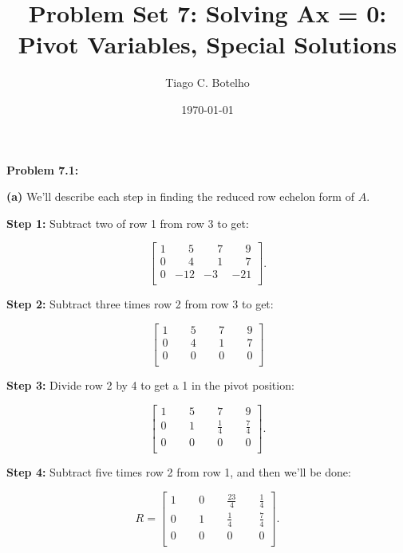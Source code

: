 \documentclass{article}
\title{Problem Set 7:  Solving Ax = 0: Pivot Variables,  Special Solutions}
\author{Tiago C. Botelho}
\date{\today}
\begin{document}
\maketitle

\noindent \textbf{Problem 7.1:}

\noindent \textbf{(a)} We'll describe each step in finding the reduced row echelon form of $A$.

\noindent \textbf{Step 1:} Subtract two of row 1 from row 3 to get:

\[
\begin{bmatrix}
1 & \phantom{-}5 & \phantom{-}7 & \phantom{-}9\\
0 & \phantom{-}4 & \phantom{-}1 & \phantom{-}7\\
0 & -12 & -3 & -21\\
\end{bmatrix}.
\]

\noindent \textbf{Step 2:} Subtract three times row 2 from row 3 to get:

\[
\begin{bmatrix}
1 & \phantom{-}5 & \phantom{-}7 & \phantom{-}9\\
0 & \phantom{-}4 & \phantom{-}1 & \phantom{-}7\\
0 & \phantom{-}0 & \phantom{-}0 & \phantom{-}0\\
\end{bmatrix}
\]

\noindent \textbf{Step 3:} Divide row 2 by 4 to get a 1 in the pivot position:

\[
\begin{bmatrix}
1 & \phantom{-}5 & \phantom{-}7 & \phantom{-}9\\
0 & \phantom{-}1 & \phantom{-}\frac{1}{4} & \phantom{-}\frac{7}{4}\\
0 & \phantom{-}0 & \phantom{-}0 & \phantom{-}0\\
\end{bmatrix}.
\]

\noindent \textbf{Step 4:} Subtract five times row 2 from row 1, and then we'll be done:

\[
R = \begin{bmatrix}
1 & \phantom{-}0 & \phantom{-}\frac{23}{4} & \phantom{-}\frac{1}{4}\\
0 & \phantom{-}1 & \phantom{-}\frac{1}{4} & \phantom{-}\frac{7}{4}\\
0 & \phantom{-}0 & \phantom{-}0 & \phantom{-}0\\
\end{bmatrix}.
\]
\end{document}
